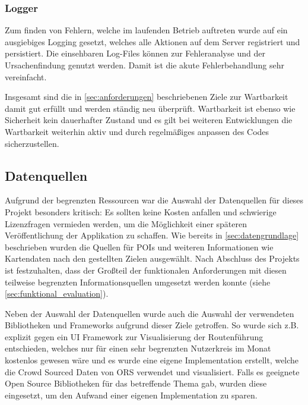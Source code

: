 	\subsubsection{Logger}
	Zum finden von Fehlern, welche im laufenden Betrieb auftreten wurde auf ein ausgiebiges Logging gesetzt, welches alle Aktionen auf dem Server registriert und persistiert. Die einsehbaren Log-Files können zur Fehleranalyse und der Ursachenfindung genutzt werden. Damit ist die akute Fehlerbehandlung sehr vereinfacht. 
	
	\vspace{0.25cm}
	
	Insgesamt sind die in \autoref{sec:anforderungen} beschriebenen Ziele zur Wartbarkeit damit gut erfüllt und werden ständig neu überprüft. Wartbarkeit ist ebenso wie Sicherheit kein dauerhafter Zustand und es gilt bei weiteren Entwicklungen die Wartbarkeit weiterhin aktiv und durch regelmäßiges anpassen des Codes sicherzustellen.
	
	
	
	\subsection{Datenquellen}
	Aufgrund der begrenzten Ressourcen war die Auswahl der Datenquellen für dieses Projekt besonders kritisch: Es sollten keine Kosten anfallen und schwierige Lizenzfragen vermieden werden, um die Möglichkeit einer späteren Veröffentlichung der Applikation zu schaffen. Wie bereits in \autoref{sec:datengrundlage} beschrieben wurden die Quellen für \acs{POI}s und weiteren Informationen wie Kartendaten nach den gestellten Zielen ausgewählt. Nach Abschluss des Projekts ist festzuhalten, dass der Großteil der funktionalen Anforderungen mit diesen teilweise begrenzten Informationsquellen umgesetzt werden konnte (siehe \autoref{sec:funktional_evaluation}).
	
	\vspace{0.25cm}
	
	Neben der Auswahl der Datenquellen wurde auch die Auswahl der verwendeten Bibliotheken und Frameworks aufgrund dieser Ziele getroffen. So wurde sich z.B. explizit gegen ein UI Framework zur Visualisierung der Routenführung entschieden, welches nur für einen sehr begrenzten Nutzerkreis im Monat kostenlos gewesen wäre und es wurde eine eigene Implementation erstellt, welche die Crowd Sourced Daten von \acs{ORS} verwendet und visualisiert. Falls es geeignete Open Source Bibliotheken für das betreffende Thema gab, wurden diese eingesetzt, um den Aufwand einer eigenen Implementation zu sparen.
	
